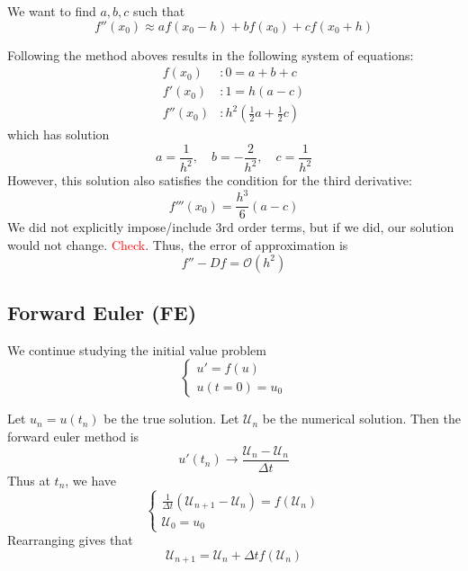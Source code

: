 \documentclass[12pt]{article}
\theoremstyle{definition}
\newcommand{\U}{\mathcal{U}}
\theoremstyle{definition}
\begin{document}
We want to find $a,b,c$ such that
\begin{equation}
	f''(x_0) \approx af(x_0 -h) + bf(x_0) + cf(x_0 + h)
\end{equation}

Following the method aboves results in the following system of equations:
\begin{align*}
	f(x_0) &: 0 = a + b + c \\
	f'(x_0) &: 1 = h(a-c) \\
	f''(x_0) &: h^2\left(\frac{1}{2}a + \frac{1}{2}c\right)
\end{align*}
which has solution
\begin{equation}
	a = \frac{1}{h^2}, \quad b = -\frac{2}{h^2}, \quad c = \frac{1}{h^2}
\end{equation}
However, this solution also satisfies the condition for the third derivative:
\begin{equation}
	f'''(x_0) = \frac{h^3}{6}(a-c)
\end{equation}
We did not explicitly impose/include 3rd order terms, but if we did, our solution would not change. \textcolor{red}{Check}. Thus, the error of approximation is
\begin{equation}
	f'' - Df = \mathcal{O}(h^2)
\end{equation}

\subsection{Forward Euler (FE)}
We continue studying the initial value problem 
\begin{equation}
	\begin{cases}
	u' = f(u) \\
	u(t=0) = u_0
	\end{cases}
\end{equation}

Let $u_n = u(t_n)$ be the true solution. Let $\mathcal{U}_n$ be the numerical solution. Then the forward euler method is
\begin{equation}
 	u'(t_n) \to \frac{\mathcal{U}_n - \mathcal{U}_n}{\Delta t}
\end{equation} 
Thus at $t_n$, we have
\begin{equation}
	\begin{cases}
		\frac{1}{\Delta t}(\U_{n+1} - \U_n) = f(\U_n) \\
		\U_0 = u_0
	\end{cases}
\end{equation}
Rearranging gives that 
\begin{equation}
	\U_{n+1} = \U_n + \Delta t f(\U_n)
\end{equation}
\end{document}
